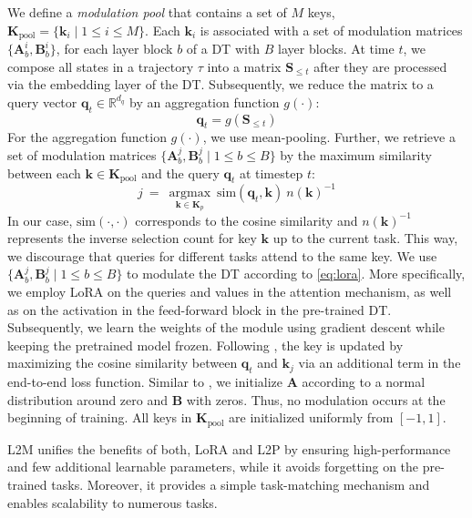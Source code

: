 \documentclass{article}
\begin{document}
We define a \emph{modulation pool} that contains a set of $M$ keys, $\mathbf{K}_{\text{pool}} = \{\mathbf{k}_i \mid 1 \leq i \leq M \}$.
Each $\mathbf{k}_i$ is associated with a set of modulation matrices $\{ \mathbf{A}_{b}^i, \mathbf{B}_{b}^i \}$, for each layer block $b$ of a DT with $B$ layer blocks.
At time $t$, we compose all states in a trajectory $\tau$ into a matrix $\mathbf{S}_{\leq t}$ after they are processed via the embedding layer of the DT.
Subsequently, we reduce the matrix to a query vector $\mathbf{q}_t \in \mathbb{R}^{d_q}$ by an aggregation function $g(\cdot)$:
\begin{equation}
    \mathbf{q}_t = g(\mathbf{S}_{\leq t})
\end{equation}
For the aggregation function $g(\cdot)$, we use mean-pooling.
Further, we retrieve a set of modulation matrices $\{ \mathbf{A}_{b}^j, \mathbf{B}_{b}^j \mid 1 \leq b \leq B\}$ by the maximum similarity between each $\mathbf{k} \in \mathbf{K}_{\text{pool}}$ and the query $\mathbf{q}_t$ at timestep $t$:
\begin{equation}
    j \ = \ \operatorname*{argmax}_{\mathbf{k} \in \mathbf{K}_p} \ \text{sim} (\mathbf{q}_t, \mathbf{k}) \ n(\mathbf{k})^{-1}
\end{equation}
In our case, $\text{sim}(\cdot, \cdot)$ corresponds to the cosine similarity and $n(\mathbf{k})^{-1}$ represents the inverse selection count for key $\mathbf{k}$ up to the current task.
This way, we discourage that queries for different tasks attend to the same key. 
We use $\{ \mathbf{A}_{b}^j, \mathbf{B}_{b}^j \mid 1 \leq b \leq B\}$ to modulate the DT according to \cref{eq:lora}. 
More specifically, we employ LoRA on the queries and values in the attention mechanism, as well as on the activation in the feed-forward block in the pre-trained DT.
Subsequently, we learn the weights of the module using gradient descent while keeping the pretrained model frozen. 
Following \citet{Wang:22}, the key is updated by maximizing the cosine similarity between $\mathbf{q}_t$ and $\mathbf{k}_j$ via an additional term in the end-to-end loss function.
Similar to \citet{Hu:21}, we initialize $\mathbf{A}$ according to a normal distribution around zero and $\mathbf{B}$ with zeros.
Thus, no modulation occurs at the beginning of training.
All keys in $\mathbf{K}_{\text{pool}}$ are initialized uniformly from $[-1, 1]$. 

L2M unifies the benefits of both, LoRA and L2P by ensuring high-performance and few additional learnable parameters, while it avoids forgetting on the pre-trained tasks.
Moreover, it provides a simple task-matching mechanism and enables scalability to numerous tasks.
\end{document}
